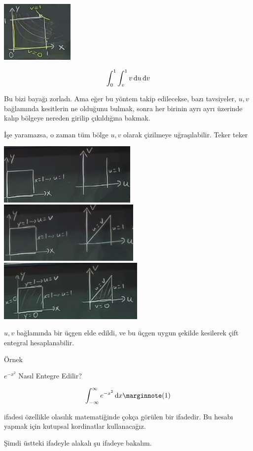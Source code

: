 \documentclass[12pt,fleqn]{article}\usepackage{../../common}
\begin{document}
\includegraphics[height=3cm]{18_8.png}

$$ \int_0^1 \int _v^1 v \,\mathrm{d} u \,\mathrm{d} v $$

Bu bizi bayağı zorladı. Ama eğer bu yöntem takip edilecekse, bazı tavsiyeler,
$u,v$ bağlamında kesitlerin ne olduğunu bulmak, sonra her birinin ayrı ayrı
üzerinde kalıp bölgeye nereden girilip çıkıldığına bakmak.

İşe yaramazsa, o zaman tüm bölge $u,v$ olarak çizilmeye
uğraşılabilir. Teker teker 

\includegraphics[height=3cm]{18_9.png}
\includegraphics[height=3cm]{18_10.png}
\includegraphics[height=3cm]{18_11.png}

$u,v$ bağlamında bir üçgen elde edildi, ve bu üçgen uygun şekilde kesilerek çift
entegral hesaplanabilir.

Örnek

$e^{-x^2}$ Nasıl Entegre Edilir? 

$$ 
\int_{-\infty}^{\infty} e^{-x^2} \ud x 
\mlabel{1} 
$$

ifadesi özellikle olasılık matematiğinde çokça görülen bir ifadedir. Bu
hesabı yapmak için kutupsal kordinatlar kullanacağız. 

Şimdi üstteki ifadeyle alakalı şu ifadeye bakalım. 
\end{document}

